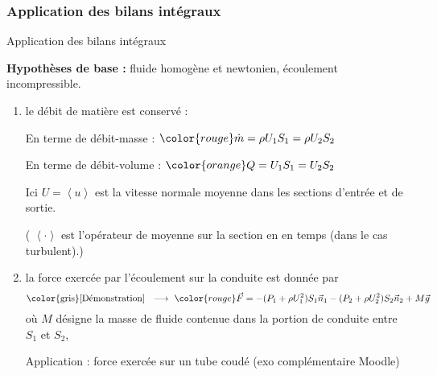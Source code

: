 \subsubsection{Application des bilans intégraux}
\begin{frame}{Application des bilans intégraux}


\small


\textbf{Hypothèses de base :} fluide homogène et newtonien, écoulement incompressible.

\smallskip


\begin{enumerate}
\pause
\item
	le \textcolor{vert}{débit de matière} est conservé :

	En terme de débit-masse : $\color{rouge} \dot m = \rho U_1 S_1 = \rho U_2 S_2$
	
	En terme de débit-volume : $\color{orange} Q = U_1 S_1 =  U_2 S_2$

Ici $U = \left< u \right>$ est la vitesse normale moyenne dans les sections d'entrée et de sortie.

( $\left< \cdot \right>$  est l'opérateur de moyenne
 sur la section en en temps (dans le cas turbulent).)



\pause
\item
	la \textcolor{vert}{force exercée par l'écoulement sur la conduite} est donnée par
	\[
		\mbox{\color{gris} [Démonstration] \; $\longrightarrow$ \;}
		\color{rouge}
		\myvec{F} = -(P_1+\rho U_1^2) S_1\myvec{n}_1 -(P_2+\rho U_2^2) S_2\myvec{n}_2 + M\myvec{g}
	\]
	où $M$ désigne la masse de fluide contenue dans la portion de conduite entre $S_1$ et $S_2$,

\textcolor{gris}{Application : force exercée sur un tube coudé (exo complémentaire Moodle)}


\pause




\end{enumerate}
\end{frame}
